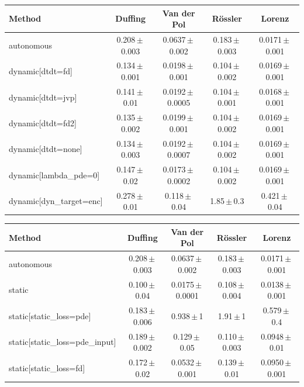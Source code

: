 \begin{tabular}{lcccc}
\toprule
Method & Duffing & Van der Pol & R\"ossler & Lorenz \\
\midrule
autonomous & 0.208\,$\pm$\,0.003 & 0.0637\,$\pm$\,0.002 & 0.183\,$\pm$\,0.003 & 0.0171\,$\pm$\,0.001 \\
dynamic[dtdt=fd] & 0.134\,$\pm$\,0.001 & 0.0198\,$\pm$\,0.001 & 0.104\,$\pm$\,0.002 & 0.0169\,$\pm$\,0.001 \\
dynamic[dtdt=jvp] & 0.141\,$\pm$\,0.01 & 0.0192\,$\pm$\,0.0005 & 0.104\,$\pm$\,0.001 & 0.0168\,$\pm$\,0.001 \\
dynamic[dtdt=fd2] & 0.135\,$\pm$\,0.002 & 0.0199\,$\pm$\,0.001 & 0.104\,$\pm$\,0.002 & 0.0169\,$\pm$\,0.001 \\
dynamic[dtdt=none] & 0.134\,$\pm$\,0.003 & 0.0192\,$\pm$\,0.0007 & 0.104\,$\pm$\,0.002 & 0.0169\,$\pm$\,0.001 \\
dynamic[lambda\_pde=0] & 0.147\,$\pm$\,0.02 & 0.0173\,$\pm$\,0.0002 & 0.104\,$\pm$\,0.002 & 0.0169\,$\pm$\,0.001 \\
dynamic[dyn\_target=enc] & 0.278\,$\pm$\,0.01 & 0.118\,$\pm$\,0.04 & 1.85\,$\pm$\,0.3 & 0.421\,$\pm$\,0.04 \\
\bottomrule
\end{tabular}

\begin{tabular}{lcccc}
\toprule
Method & Duffing & Van der Pol & R\"ossler & Lorenz \\
\midrule
autonomous & 0.208\,$\pm$\,0.003 & 0.0637\,$\pm$\,0.002 & 0.183\,$\pm$\,0.003 & 0.0171\,$\pm$\,0.001 \\
static & 0.100\,$\pm$\,0.04 & 0.0175\,$\pm$\,0.0001 & 0.108\,$\pm$\,0.004 & 0.0138\,$\pm$\,0.001 \\
static[static\_loss=pde] & 0.183\,$\pm$\,0.006 & 0.938\,$\pm$\,1 & 1.91\,$\pm$\,1 & 0.579\,$\pm$\,0.4 \\
static[static\_loss=pde\_input] & 0.189\,$\pm$\,0.002 & 0.129\,$\pm$\,0.05 & 0.110\,$\pm$\,0.003 & 0.0948\,$\pm$\,0.01 \\
static[static\_loss=fd] & 0.172\,$\pm$\,0.02 & 0.0532\,$\pm$\,0.001 & 0.139\,$\pm$\,0.01 & 0.0950\,$\pm$\,0.001 \\
\bottomrule
\end{tabular}

